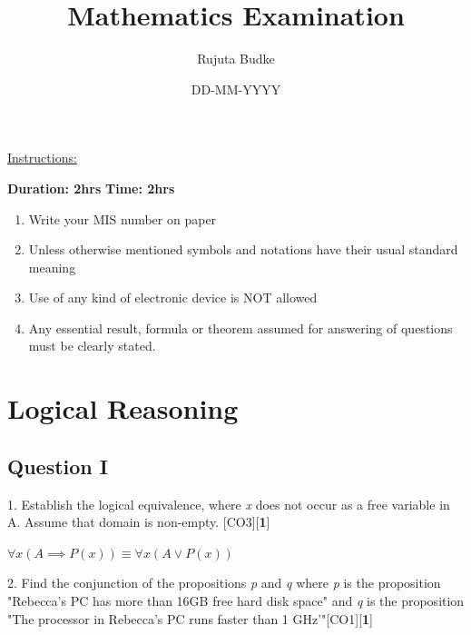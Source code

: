 \documentclass[a4paper]{article}
\begin{document}
  
\title{Mathematics Examination}
\date{DD-MM-YYYY}
\author{Rujuta Budke}
\maketitle

\newpage
\tableofcontents
\newpage

\begin{Large}
\underline{Instructions:}\\
\end{Large}


\noindent \textbf{Duration: 2hrs} \hfill \textbf{Time: 2hrs}
\begin{enumerate}
\item Write your MIS number on paper 
\item Unless otherwise mentioned symbols and notations have their usual standard meaning
\item Use of any kind of electronic device is NOT allowed
\item Any essential result, formula or theorem assumed for answering of questions must be clearly stated.
\end{enumerate}



\pagebreak

\section{Logical Reasoning}
\subsection*{Question I}
1. Establish the logical equivalence, where \textit{x} does not occur as a free variable in A. Assume that domain is non-empty. \hfill [CO3][{\bf 1}]
\begin{center}
$ \forall x (A \implies P(x))\equiv \forall x (A \lor P(x))$
\end{center}

2. Find the conjunction of the propositions \textit{p} and \textit{q} where \textit{p} is the proposition "Rebecca's PC has more than 16GB free hard disk space" and \textit{q} is the proposition "The processor in Rebecca's PC runs faster than 1 GHz'"\hfill [CO1][{\bf 1}]
\end{document}

